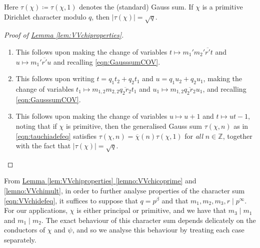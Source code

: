 \documentclass[11pt,a4paper]{amsart}
\newcommand{\Z}{\mathbb{Z}}
\numberwithin{equation}{section}
\theoremstyle{remark}
\theoremstyle{definition}
\begin{document}
Here $\tau(\chi) \coloneqq \tau(\chi,1)$ denotes the (standard) Gauss sum. If $\chi$ is a primitive Dirichlet character modulo $q$, then $|\tau(\chi)| = \sqrt{q}$.

\begin{proof}[Proof of {\hyperref[lem:VVchiproperties]{Lemma \ref*{lem:VVchiproperties}}}]\hspace{1em}

\begin{enumerate}[leftmargin=*,label=\textup{(\arabic*)}]
\item This follows upon making the change of variables $t \mapsto m_1' m_2' \overline{r'} t$ and $u \mapsto m_1' \overline{r'} u$ and recalling \eqref{eqn:GausssumCOV}.
\item This follows upon writing $t = q_1 t_2 + q_2 t_1$ and $u = q_1 u_2 + q_2 u_1$, making the change of variables $t_1 \mapsto m_{1,2} m_{2,2} \overline{q_2 r_2} t_1$ and $u_1 \mapsto m_{1,2} \overline{q_2 r_2} u_1$, and recalling \eqref{eqn:GausssumCOV}.
\item This follows upon making the change of variables $u \mapsto u + 1$ and $t \mapsto ut - 1$, noting that if $\chi$ is primitive, then the generalised Gauss sum $\tau(\chi,n)$ as in \eqref{eqn:tauchiadefeq} satisfies $\tau(\chi,n) = \overline{\chi}(n) \tau(\chi,1)$ for \emph{all} $n \in \Z$, together with the fact that $|\tau(\chi)| = \sqrt{q}$.\qedhere
\end{enumerate}
\end{proof}

From \hyperref[lemno:VVchicoprime]{Lemma \ref*{lem:VVchiproperties} \ref*{lemno:VVchicoprime}} and \ref{lemno:VVchimult}, in order to further analyse properties of the character sum \eqref{eqn:VVchidefeq}, it suffices to suppose that $q = p^{\beta}$ and that $m_1,m_2,m_3,r \mid p^{\infty}$. For our applications, $\chi$ is either principal or primitive, and we have that $m_3 \mid m_1$ and $m_1 \mid m_2$. The exact behaviour of this character sum depends delicately on the conductors of $\chi$ and $\psi$, and so we analyse this behaviour by treating each case separately.
\end{document}
